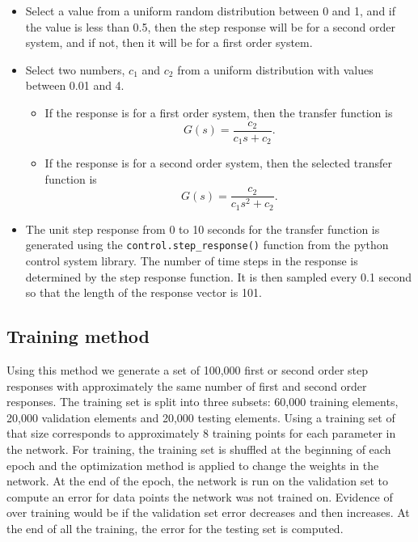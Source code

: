   \begin{itemize}

    \item Select a value from a uniform random distribution between 0 and 1, and
    if the value is less than 0.5, then the step response will be for a second
    order system, and if not, then it will be for a first order system.

    \item Select two numbers, $c_1$ and $c_2$ from a uniform distribution with
    values between 0.01 and 4.

    \begin{itemize}

      \item If the response is for a first order system, then the transfer
      function is
      \[
        G(s) = \frac{c_2}{c_1 s + c_2}.
      \]

      \item If the response is for a second order system, then the selected
      transfer function is
      \[
        G(s) = \frac{c_2}{c_1 s^2 + c_2}.
      \]

    \end{itemize}

	\item The unit step response from 0 to 10 seconds for the transfer function
	  is generated using the \texttt{control.step\_response()} function from the
	  python control system library. The number of time steps in the response is
	  determined by the step response function. It is then sampled every 0.1
	  second so that the length of the response vector is 101.

\end{itemize} 

\subsection{Training method}

    Using this method we generate a set of 100,000 first or second order step
    responses with approximately the same number of first and second order
    responses. The training set is split into three subsets: 60,000 training
    elements, 20,000 validation elements and 20,000 testing elements. Using a
    training set of that size corresponds to approximately 8 training points for
    each parameter in the network. For training, the training set is shuffled at
    the beginning of each epoch and the optimization method is applied to change
    the weights in the network.  At the end of the epoch, the network is run on
    the validation set to compute an error for data points the network was not
    trained on. Evidence of over training would be if the validation set error
    decreases and then increases.  At the end of all the training, the error for
    the testing set is computed.

